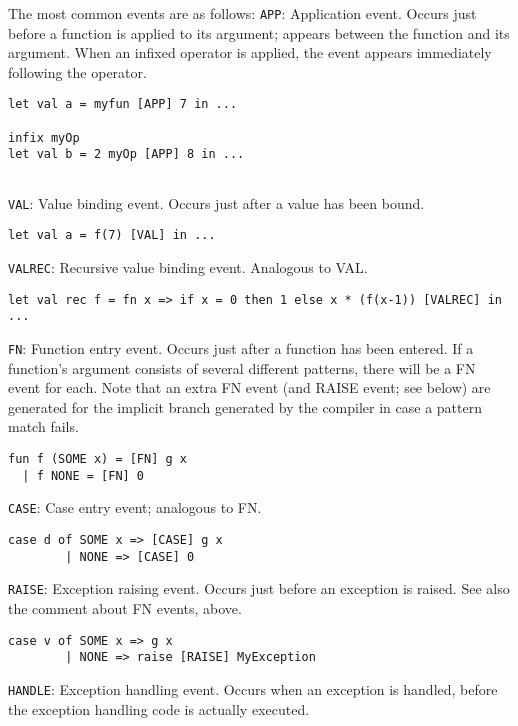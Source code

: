 The most common events are as follows:
\verb'APP': Application event.  Occurs just before a function is applied to
its argument; appears between the function and its argument.  When an
infixed operator is applied, the event appears immediately following
the operator.

\begin{verbatim}
let val a = myfun [APP] 7 in ...

infix myOp
let val b = 2 myOp [APP] 8 in ...
       
\end{verbatim}

\vspace{0.25in}
\verb'VAL': Value binding event.  Occurs just after a value has been bound.

\begin{verbatim}
let val a = f(7) [VAL] in ...
\end{verbatim}

\verb'VALREC': Recursive value binding event.  Analogous to VAL.

\begin{verbatim}
let val rec f = fn x => if x = 0 then 1 else x * (f(x-1)) [VALREC] in ...
\end{verbatim}

\verb'FN': Function entry event.  Occurs just after a function has been
entered.  If a function's argument consists of several different
patterns, there will be a FN event for each. Note that an extra FN event
(and RAISE event; see below) are generated for the implicit branch generated
by the compiler in case a pattern match fails.

\begin{verbatim}
fun f (SOME x) = [FN] g x
  | f NONE = [FN] 0
\end{verbatim}

\verb'CASE': Case entry event; analogous to FN.

\begin{verbatim}
case d of SOME x => [CASE] g x
        | NONE => [CASE] 0
\end{verbatim}


\verb'RAISE': Exception raising event.  Occurs just before an exception is
raised.  See also the comment about FN events, above.


\begin{verbatim}
case v of SOME x => g x
        | NONE => raise [RAISE] MyException
\end{verbatim}

\verb'HANDLE': Exception handling event.  Occurs when an exception is
handled, before the exception handling code is actually executed.

